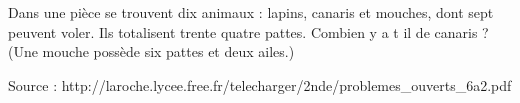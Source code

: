 
Dans  une  pièce  se  trouvent  dix  animaux :  lapins,  canaris  et  mouches,  dont  sept  peuvent voler.  Ils  totalisent  trente quatre  pattes. Combien y a t il de canaris ? (Une mouche possède six pattes et deux ailes.) 

\hfill{{\scriptsize Source : http://laroche.lycee.free.fr/telecharger/2nde/problemes\_ouverts\_6a2.pdf}}